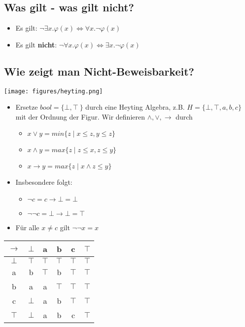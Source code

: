 \documentclass{scrartcl}
\begin{document}
\subsection{Was gilt - was gilt nicht?}

\normalsize
\begin{itemize}
	\item Es gilt: $ \neg \exists x.\varphi(x) \iff \forall x. \neg \varphi(x) $
	\item Es gilt \textbf{nicht}: $ \neg \forall x.\varphi(x) \iff \exists x.\neg \varphi(x) $
\end{itemize}

\subsection{Wie zeigt man Nicht-Beweisbarkeit?}

\texttt{[image: figures/heyting.png]}

\begin{itemize}
	\item Ersetze $ bool = \{ \bot,\top\ \} $ durch eine Heyting Algebra, z.B. $ H = \{ \bot,\top,a,b,c \} $ mit der Ordnung der Figur. Wir definieren $ \wedge,\vee,\rightarrow $ durch
	\begin{itemize}
		\item $ x \vee y = min\{ z \mid x \leq z, y \leq z \} $
		\item $ x \wedge y = max\{ z \mid z \leq x, z \leq y \} $
		\item $ x \rightarrow y = max\{ z \mid x \wedge z \leq y \} $
	\end{itemize}
	\item Insbesondere folgt:
	\begin{itemize}
		\item $ \neg c = c \rightarrow \bot = \bot $
		\item $ \neg \neg c = \bot \rightarrow \bot = \top $
	\end{itemize}
	\item Für alle $ x \neq c $ gilt $ \neg \neg x = x $
\end{itemize}

\begin{tabular}{|c|c|c|c|c|c|}
	\hline 
	$ \rightarrow $ & $ \bot $ & a & b & c & $ \top $ \\ 
	\hline 
	$ \bot $ & $ \top $ & $ \top $ & $ \top $ & $ \top $ & $ \top $ \\ 
	\hline 
	a & b & $ \top $ & b & $ \top $ & $ \top $ \\ 
	\hline 
	b & a & a & $ \top $ & $ \top $ & $ \top $ \\ 
	\hline 
	c & $ \bot $ & a & b & $ \top $ & $ \top $ \\ 
	\hline 
	$ \top $ & $ \bot $ & a & b & c & $ \top $ \\ 
	\hline 
\end{tabular} 
\end{document}
